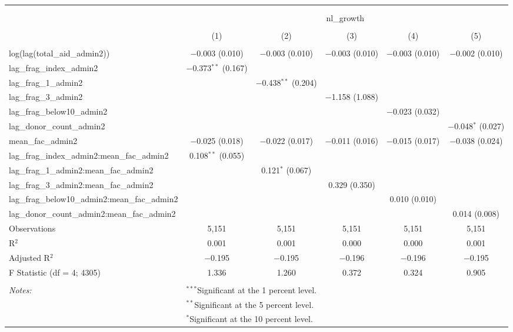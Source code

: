 
\begin{table}[!htbp] \centering 
  \caption{} 
  \label{} 
\begin{tabular}{@{\extracolsep{2pt}}lccccc} 
\\[-1.8ex]\hline 
\hline \\[-1.8ex] 
\\[-1.8ex] & \multicolumn{5}{c}{nl\_growth} \\ 
\\[-1.8ex] & (1) & (2) & (3) & (4) & (5)\\ 
\hline \\[-1.8ex] 
 log(lag(total\_aid\_admin2)) & $-$0.003 (0.010) & $-$0.003 (0.010) & $-$0.003 (0.010) & $-$0.003 (0.010) & $-$0.002 (0.010) \\ 
  lag\_frag\_index\_admin2 & $-$0.373$^{**}$ (0.167) &  &  &  &  \\ 
  lag\_frag\_1\_admin2 &  & $-$0.438$^{**}$ (0.204) &  &  &  \\ 
  lag\_frag\_3\_admin2 &  &  & $-$1.158 (1.088) &  &  \\ 
  lag\_frag\_below10\_admin2 &  &  &  & $-$0.023 (0.032) &  \\ 
  lag\_donor\_count\_admin2 &  &  &  &  & $-$0.048$^{*}$ (0.027) \\ 
  mean\_fac\_admin2 & $-$0.025 (0.018) & $-$0.022 (0.017) & $-$0.011 (0.016) & $-$0.015 (0.017) & $-$0.038 (0.024) \\ 
  lag\_frag\_index\_admin2:mean\_fac\_admin2 & 0.108$^{**}$ (0.055) &  &  &  &  \\ 
  lag\_frag\_1\_admin2:mean\_fac\_admin2 &  & 0.121$^{*}$ (0.067) &  &  &  \\ 
  lag\_frag\_3\_admin2:mean\_fac\_admin2 &  &  & 0.329 (0.350) &  &  \\ 
  lag\_frag\_below10\_admin2:mean\_fac\_admin2 &  &  &  & 0.010 (0.010) &  \\ 
  lag\_donor\_count\_admin2:mean\_fac\_admin2 &  &  &  &  & 0.014 (0.008) \\ 
 Observations & 5,151 & 5,151 & 5,151 & 5,151 & 5,151 \\ 
R$^{2}$ & 0.001 & 0.001 & 0.000 & 0.000 & 0.001 \\ 
Adjusted R$^{2}$ & $-$0.195 & $-$0.195 & $-$0.196 & $-$0.196 & $-$0.195 \\ 
F Statistic (df = 4; 4305) & 1.336 & 1.260 & 0.372 & 0.324 & 0.905 \\ 
\hline \\[-1.8ex] 
\textit{Notes:} & \multicolumn{5}{l}{$^{***}$Significant at the 1 percent level.} \\ 
 & \multicolumn{5}{l}{$^{**}$Significant at the 5 percent level.} \\ 
 & \multicolumn{5}{l}{$^{*}$Significant at the 10 percent level.} \\ 
\end{tabular} 
\end{table} 
